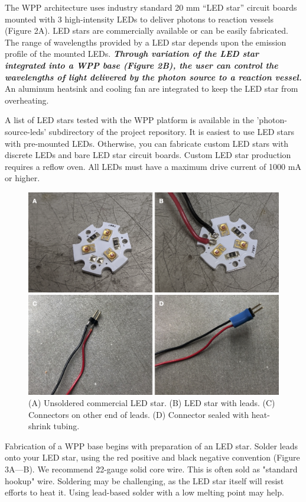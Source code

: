 \documentclass[11pt]{article}
\begin{document}
The WPP architecture uses industry standard 20 mm ``LED star'' circuit boards mounted with 3 high-intensity LEDs to deliver photons to reaction vessels (Figure 2A).
LED stars are commercially available or can be easily fabricated.
The range of wavelengths provided by a LED star depends upon the emission profile of the mounted LEDs.
\textbf{\textit{Through variation of the LED star integrated into a WPP base (Figure 2B), the user can control the wavelengths of light delivered by the photon source to a reaction vessel.}}
An aluminum heatsink and cooling fan are integrated to keep the LED star from overheating.

A list of LED stars tested with the WPP platform is available in the 'photon-source-leds' subdirectory of the project repository.
It is easiest to use LED stars with pre-mounted LEDs.
Otherwise, you can fabricate custom LED stars with discrete LEDs and bare LED star circuit boards.
Custom LED star production requires a reflow oven.
All LEDs must have a maximum drive current of 1000 mA or higher.

\begin{figure}[H]
	\includegraphics[width=\textwidth]{"./fig3.png"}
	\caption{(A) Unsoldered commercial LED star. (B) LED star with leads. (C) Connectors on other end of leads. (D) Connector sealed with heat-shrink tubing.}
\end{figure}

Fabrication of a WPP base begins with preparation of an LED star.
Solder leads onto your LED star, using the red positive and black negative convention (Figure 3A---B).
We recommend 22-gauge solid core wire.
This is often sold as "standard hookup" wire.
Soldering may be challenging, as the LED star itself will resist efforts to heat it.
Using lead-based solder with a low melting point may help.
\end{document}
